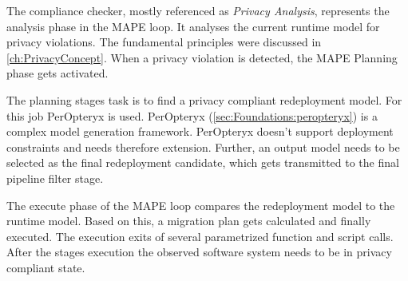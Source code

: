 The compliance checker, mostly referenced as \textit{Privacy Analysis}, represents the analysis phase in the MAPE loop. It analyses the current runtime model for privacy violations. The fundamental principles were discussed in \autoref{ch:PrivacyConcept}. When a privacy violation is detected, the MAPE Planning phase gets activated.

The planning stages task is to find a privacy compliant redeployment model. For this job PerOpteryx is used. PerOpteryx (\autoref{sec:Foundations:peropteryx}) is a complex model generation framework. PerOpteryx doesn't support deployment constraints and needs therefore extension. Further, an output model needs to be selected as the final redeployment candidate, which gets transmitted to the final pipeline filter stage.

The execute phase of the MAPE loop compares the redeployment model to the runtime model. Based on this, a migration plan gets calculated and finally executed. The execution exits of several parametrized function and script calls. After the stages execution the observed software system needs to be in privacy compliant state.



